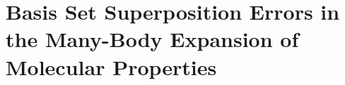 \chapter{Basis Set Superposition Errors in the Many-Body Expansion of Molecular Properties} \label{ch:p1}




